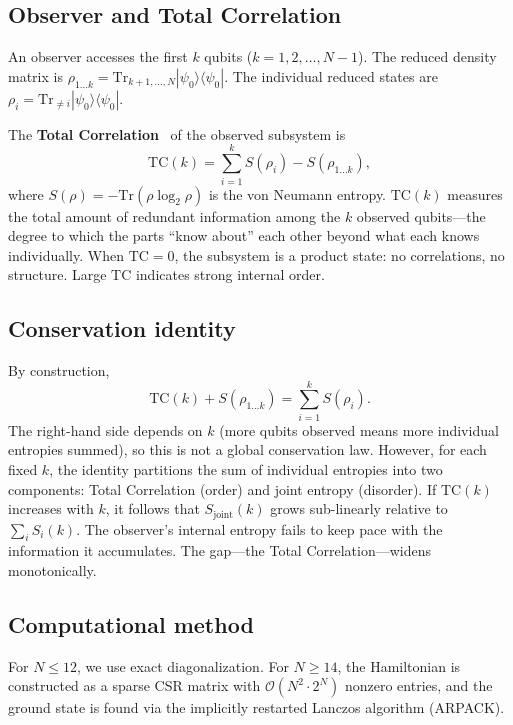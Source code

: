 \documentclass[aps,pra,twocolumn,superscriptaddress,floatfix]{revtex4-2}
\begin{document}
\subsection{Observer and Total Correlation}

An observer accesses the first $k$ qubits ($k = 1, 2, \ldots, N-1$).
The reduced density matrix is $\rho_{1\ldots k} = \mathrm{Tr}_{k+1,\ldots,N} |\psi_0\rangle\langle\psi_0|$.
The individual reduced states are $\rho_i = \mathrm{Tr}_{\neq i} |\psi_0\rangle\langle\psi_0|$.

The \textbf{Total Correlation}~\cite{watanabe1960,studeny1998} of the observed subsystem is
\begin{equation}
\mathrm{TC}(k) = \sum_{i=1}^{k} S(\rho_i) - S(\rho_{1\ldots k}),
\label{eq:tc}
\end{equation}
where $S(\rho) = -\mathrm{Tr}(\rho \log_2 \rho)$ is the von Neumann entropy.
$\mathrm{TC}(k)$ measures the total amount of redundant information among the $k$ observed qubits---the degree to which the parts ``know about'' each other beyond what each knows individually.
When $\mathrm{TC} = 0$, the subsystem is a product state: no correlations, no structure.
Large $\mathrm{TC}$ indicates strong internal order.

\subsection{Conservation identity}

By construction,
\begin{equation}
\mathrm{TC}(k) + S(\rho_{1\ldots k}) = \sum_{i=1}^{k} S(\rho_i).
\label{eq:identity}
\end{equation}
The right-hand side depends on $k$ (more qubits observed means more individual entropies summed), so this is not a global conservation law.
However, for each fixed $k$, the identity partitions the sum of individual entropies into two components: Total Correlation (order) and joint entropy (disorder).
If $\mathrm{TC}(k)$ increases with $k$, it follows that $S_{\mathrm{joint}}(k)$ grows sub-linearly relative to $\sum_i S_i(k)$.
The observer's internal entropy fails to keep pace with the information it accumulates.
The gap---the Total Correlation---widens monotonically.

\subsection{Computational method}

For $N \leq 12$, we use exact diagonalization.
For $N \geq 14$, the Hamiltonian is constructed as a sparse CSR matrix with $\mathcal{O}(N^2 \cdot 2^N)$ nonzero entries, and the ground state is found via the implicitly restarted Lanczos algorithm (ARPACK).
\end{document}
